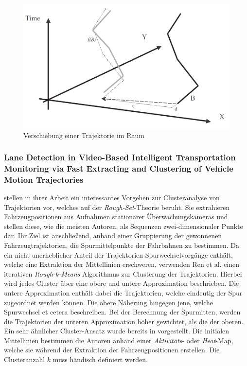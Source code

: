 \begin{figure}[H]
    \centering
    \includegraphics[width=0.55\linewidth]{../resources/img/RelatedWork/vlachos_translation}
    \caption[Verschiebung einer Trajektorie im Raum]{Verschiebung einer Trajektorie im Raum \cite[]{Vlachos2002}}
    \label{fig:relw_vlachos_translation}
\end{figure}

\subsubsection*{Lane Detection in Video-Based Intelligent Transportation Monitoring via Fast Extracting and Clustering of Vehicle Motion Trajectories}

\cite[]{Ren2014} stellen in ihrer Arbeit ein interessantes Vorgehen zur Clusteranalyse von Trajektorien vor,
welches auf der \textit{Rough-Set}-Theorie beruht. Sie extrahieren Fahrzeugpositionen aus Aufnahmen stationärer
Überwachungskameras und stellen diese, wie die meisten Autoren, als Sequenzen zwei-dimensionaler
Punkte dar. Ihr Ziel ist anschließend, anhand einer Gruppierung der gewonnenen Fahrzeugtrajektorien,
die Spurmittelpunkte der Fahrbahnen zu bestimmen. Da ein nicht unerheblicher Anteil der Trajektorien Spurwechselvorgänge
enthält, welche eine Extraktion der Mittellinien erschweren, verwenden Ren et al. einen iterativen \textit{Rough-k-Means}
Algorithmus zur Clusterung der Trajektorien. Hierbei wird jedes Cluster über eine obere und untere Approximation beschrieben.
Die untere Approximation enthält dabei die Trajektorien, welche eindeutig der Spur zugeordnet werden können.
Die obere Näherung hingegen jene, welche Spurwechsel et cetera beschreiben. Bei der Berechnung der Spurmitten, werden
die Trajektorien der unteren Approximation höher gewichtet, als die der oberen. Ein sehr ähnlicher Cluster-Ansatz wurde
bereits in \cite[]{Lingras2004} vorgestellt.
Die initialen Mittellinien bestimmen die Autoren anhand einer \textit{Aktivitäts}- oder \textit{Heat}-Map,
welche sie während der Extraktion der Fahrzeugpositionen erstellen. Die Clusteranzahl $k$ muss händisch definiert werden.

